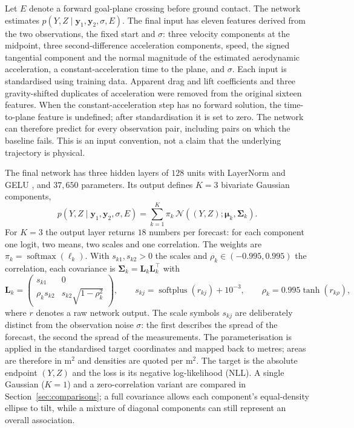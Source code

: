\documentclass[11pt,a4paper]{article}
\begin{document}
Let $E$ denote a forward goal-plane crossing before ground contact. The network estimates $p(Y,Z\mid\mathbf{y}_1,\mathbf{y}_2,\sigma,E)$. The final input has eleven features derived from the two observations, the fixed start and $\sigma$: three velocity components at the midpoint, three second-difference acceleration components, speed, the signed tangential component and the normal magnitude of the estimated aerodynamic acceleration, a constant-acceleration time to the plane, and $\sigma$. Each input is standardised using training data. Apparent drag and lift coefficients and three gravity-shifted duplicates of acceleration were removed from the original sixteen features. When the constant-acceleration step has no forward solution, the time-to-plane feature is undefined; after standardisation it is set to zero. The network can therefore predict for every observation pair, including pairs on which the baseline fails. This is an input convention, not a claim that the underlying trajectory is physical.

The final network has three hidden layers of $128$ units with LayerNorm \cite{layernorm2016} and GELU \cite{gelu2016}, and $37{,}650$ parameters. Its output defines $K=3$ bivariate Gaussian components,
\begin{equation}
  p(Y,Z\mid\mathbf{y}_1,\mathbf{y}_2,\sigma,E)=
  \sum_{k=1}^{K}\pi_k\,
  \mathcal{N}\!\left((Y,Z);\boldsymbol{\mu}_k,\boldsymbol{\Sigma}_k\right).
  \label{eq:mixture}
\end{equation}
For $K=3$ the output layer returns $18$ numbers per forecast: for each component one logit, two means, two scales and one correlation. The weights are $\pi_k=\operatorname{softmax}(\ell_k)$. With $s_{k1},s_{k2}>0$ the scales and $\rho_k\in(-0.995,0.995)$ the correlation, each covariance is $\boldsymbol{\Sigma}_k=\mathbf{L}_k\mathbf{L}_k^{\!\top}$ with
\begin{equation}
  \mathbf{L}_k=
  \begin{pmatrix}
    s_{k1} & 0\\
    \rho_k s_{k2} & s_{k2}\sqrt{1-\rho_k^{2}}
  \end{pmatrix},
  \qquad
  s_{kj}=\operatorname{softplus}(r_{kj})+10^{-3},
  \qquad
  \rho_k=0.995\tanh(r_{k\rho}),
  \label{eq:chol}
\end{equation}
where $r$ denotes a raw network output. The scale symbols $s_{kj}$ are deliberately distinct from the observation noise $\sigma$: the first describes the spread of the forecast, the second the spread of the measurements. The parameterisation is applied in the standardised target coordinates and mapped back to metres; areas are therefore in $\mathrm{m^2}$ and densities are quoted per $\mathrm{m^2}$. The target is the absolute endpoint $(Y,Z)$ and the loss is its negative log-likelihood (NLL). A single Gaussian ($K=1$) and a zero-correlation variant are compared in Section~\ref{sec:comparisons}; a full covariance allows each component's equal-density ellipse to tilt, while a mixture of diagonal components can still represent an overall association.
\end{document}
